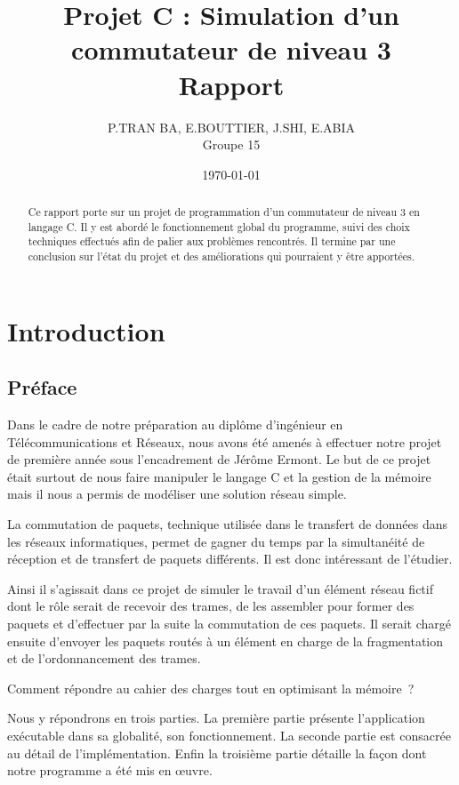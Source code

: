 \documentclass[a4paper,11pt]{article}
\title{Projet C : Simulation d'un commutateur de niveau 3\\Rapport}
\author{P.TRAN BA, E.BOUTTIER, J.SHI, E.ABIA\\Groupe 15}
\date\today
\begin{document}
\maketitle

\begin{abstract}

Ce rapport porte sur un projet de programmation d'un commutateur de niveau 3 en langage C. Il y est abordé le fonctionnement global du programme, suivi des choix techniques effectués afin de palier aux problèmes rencontrés. Il termine par une conclusion sur l'état du projet et des améliorations qui pourraient y être apportées.

\end{abstract}

\tableofcontents

\newpage

\section{Introduction}
\subsection{Préface}

Dans le cadre de notre préparation au diplôme d'ingénieur en Télécommunications et Réseaux, nous avons été amenés à effectuer notre projet de première année sous l'encadrement de Jérôme Ermont. Le but de ce projet était surtout de nous faire manipuler le langage C et la gestion de la mémoire mais il nous a permis de modéliser une solution réseau simple.

La commutation de paquets, technique utilisée dans le transfert de données dans les réseaux informatiques, permet de gagner du temps par la simultanéité de réception et de transfert de paquets différents. Il est donc intéressant de l'étudier. 

Ainsi il s'agissait dans ce projet de simuler le travail d'un élément réseau fictif dont le rôle serait de recevoir des trames, de les assembler pour former des paquets et d'effectuer par la suite la commutation de ces paquets. Il serait chargé ensuite d'envoyer les paquets routés à un élément en charge de la fragmentation et de l'ordonnancement des trames.

Comment répondre au cahier des charges tout en optimisant la mémoire ? 

Nous y répondrons en trois parties. La première partie présente l'application exécutable dans sa globalité, son fonctionnement. La seconde partie est consacrée au détail de l'implémentation. Enfin la troisième partie détaille la façon dont notre programme a été mis en œuvre.
\end{document}
